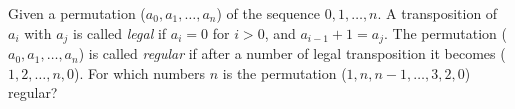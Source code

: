 Given a permutation ($a_0, a_1, \ldots, a_n$) of the sequence $0, 1,\ldots, n$. A transposition of $a_i$ with $a_j$ is called \emph{legal} if $a_i=0$ for $i>0$, and $a_{i-1}+1=a_j$. The permutation ($a_0, a_1, \ldots, a_n$) is called \emph{regular} if after a number of legal transposition it becomes ($1,2, \ldots, n,0$).
For which numbers $n$ is the permutation ($1, n, n-1, \ldots, 3, 2, 0$) regular?